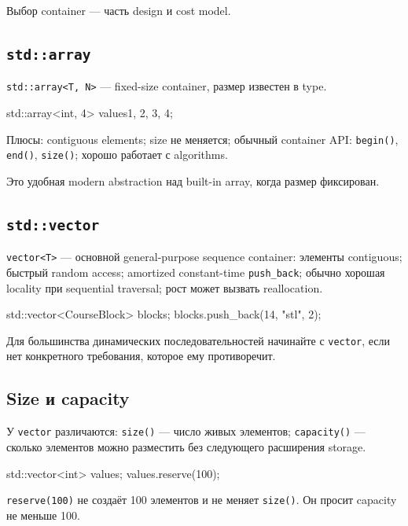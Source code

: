 Выбор container --- часть design и cost model.

\subsection{\texttt{std::array}}

\texttt{std::array<T, N>} --- fixed-size container, размер известен в type.

\begin{cppcode}
std::array<int, 4> values{1, 2, 3, 4};
\end{cppcode}

Плюсы:
contiguous elements; size не меняется; обычный container API: \texttt{begin()}, \texttt{end()}, \texttt{size()}; хорошо работает с algorithms.

Это удобная modern abstraction над built-in array, когда размер фиксирован.

\subsection{\texttt{std::vector}}

\texttt{vector<T>} --- основной general-purpose sequence container:
элементы contiguous; быстрый random access; amortized constant-time \texttt{push\_back}; обычно хорошая locality при sequential traversal; рост может вызвать reallocation.

\begin{cppcode}
std::vector<CourseBlock> blocks;
blocks.push_back({14, "stl", 2});
\end{cppcode}

Для большинства динамических последовательностей начинайте с \texttt{vector}, если нет конкретного требования, которое ему противоречит.

\subsection{Size и capacity}

У \texttt{vector} различаются:
\texttt{size()} --- число живых элементов; \texttt{capacity()} --- сколько элементов можно разместить без следующего расширения storage.

\begin{cppcode}
std::vector<int> values;
values.reserve(100);
\end{cppcode}

\texttt{reserve(100)} не создаёт 100 элементов и не меняет \texttt{size()}.
Он просит capacity не меньше 100.

